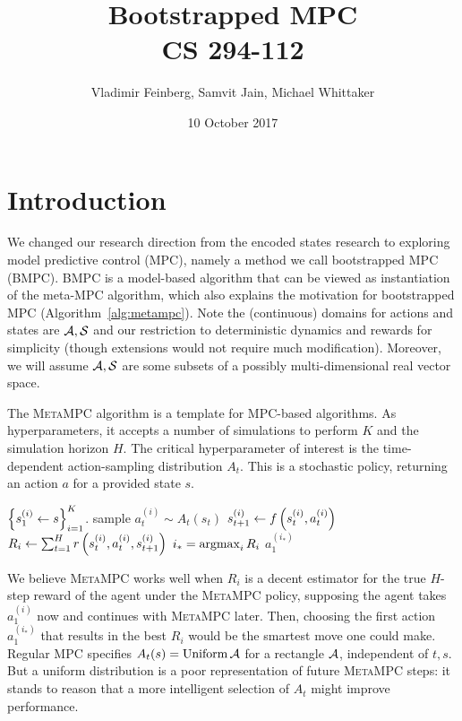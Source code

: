 \documentclass{article}
\title{Bootstrapped MPC\\\large CS 294-112}
\author{Vladimir Feinberg, Samvit Jain, Michael Whittaker}
\date{10 October 2017}
\begin{document}
	
\maketitle

\section{Introduction}

We changed our research direction from the encoded states research to exploring model predictive control (MPC), namely a method we call bootstrapped MPC (\textsc{BMPC}). \textsc{BMPC} is a model-based algorithm that can be viewed as instantiation of the meta-MPC algorithm, which also explains the motivation for bootstrapped MPC (Algorithm~\ref{alg:metampc}). Note the (continuous) domains for actions and states are $\mathcal{A}, \mathcal{S}$ and our restriction to deterministic dynamics and rewards for simplicity (though extensions would not require much modification). Moreover, we will assume $\mathcal{A},\mathcal{S}$ are some subsets of a possibly multi-dimensional real vector space.

\begin{algorithm}
\caption{The \textsc{MetaMPC} algorithm is a template for MPC-based algorithms. As hyperparameters, it accepts a number of simulations to perform $K$ and the simulation horizon $H$. The critical hyperparameter of interest is the time-dependent action-sampling distribution $A_t$. This is a stochastic policy, returning an action $a$ for a provided state $s$.}\label{alg:metampc}
\begin{algorithmic}[1]
\State $\left\{{s_1^{(i)}\gets s}\right\}_{i=1}^K$.
\State sample $a_t^{(i)}\sim A_t(s_t)$
\State $s_{t+1}^{(i)}\gets f\left({s_t^{(i)},a_t^{(i)}}\right)$
\EndFor
\State $R_i\gets\sum_{t=1}^{H}r\left({s_{t}^{(i)},a_t^{(i)},s_{t+1}^{(i)}}\right)$
\EndFor
\State $i_*=\operatorname*{argmax}_i R_i$
\State \Return $a_1^{(i_*)}$
\EndProcedure
\end{algorithmic}
\end{algorithm}

We believe \textsc{MetaMPC} works well when $R_i$ is a decent estimator for the true $H$-step reward of the agent under the \textsc{MetaMPC} policy, supposing the agent takes $a_1^{(i)}$ now and continues with \textsc{MetaMPC} later. Then, choosing the first action $a_1^{(i_*)}$ that results in the best $R_i$ would be the smartest move one could make. Regular MPC specifies $A_t(s)=\operatorname{Uniform} \mathcal{A}$ for a rectangle $\mathcal{A}$, independent of $t,s$. But a uniform distribution is a poor representation of future \textsc{MetaMPC} steps: it stands to reason that a more intelligent selection of $A_t$ might improve performance.
\end{document}
